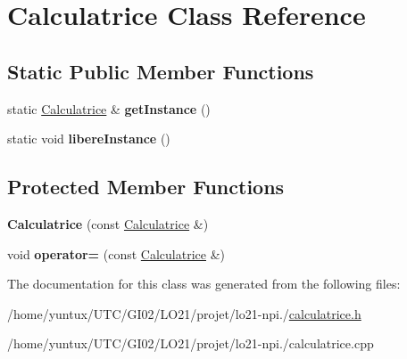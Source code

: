 \hypertarget{class_calculatrice}{\section{\-Calculatrice \-Class \-Reference}
\label{class_calculatrice}
}
\subsection*{\-Static \-Public \-Member \-Functions}
\begin{DoxyCompactItemize}
\item 
\hypertarget{class_calculatrice_a6311c8e75ac47e9f43ecd47ebc22c10b}{static \hyperlink{class_calculatrice}{\-Calculatrice} \& {\bfseries get\-Instance} ()}\label{class_calculatrice_a6311c8e75ac47e9f43ecd47ebc22c10b}

\item 
\hypertarget{class_calculatrice_aa974f5b58c583ef3aaee055eac238466}{static void {\bfseries libere\-Instance} ()}\label{class_calculatrice_aa974f5b58c583ef3aaee055eac238466}

\end{DoxyCompactItemize}
\subsection*{\-Protected \-Member \-Functions}
\begin{DoxyCompactItemize}
\item 
\hypertarget{class_calculatrice_a2761ae6e08c02c2268ba5e499a013724}{{\bfseries \-Calculatrice} (const \hyperlink{class_calculatrice}{\-Calculatrice} \&)}\label{class_calculatrice_a2761ae6e08c02c2268ba5e499a013724}

\item 
\hypertarget{class_calculatrice_ad03d57208ee06d8ebef905efbbfec7b6}{void {\bfseries operator=} (const \hyperlink{class_calculatrice}{\-Calculatrice} \&)}\label{class_calculatrice_ad03d57208ee06d8ebef905efbbfec7b6}

\end{DoxyCompactItemize}


\-The documentation for this class was generated from the following files\-:\begin{DoxyCompactItemize}
\item 
/home/yuntux/\-U\-T\-C/\-G\-I02/\-L\-O21/projet/lo21-\/npi./\hyperlink{calculatrice_8h}{calculatrice.\-h}\item 
/home/yuntux/\-U\-T\-C/\-G\-I02/\-L\-O21/projet/lo21-\/npi./calculatrice.\-cpp\end{DoxyCompactItemize}
